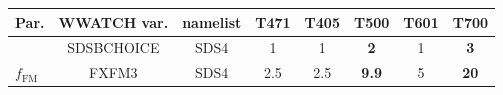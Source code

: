 \begin{landscape}
\begin{table}
\begin{center}
\begin{tabular}{|l|c|c|c|c|c|c|c|} \hline \hline
Par.                               &  WWATCH var.  & namelist  & T471        & T405             & T500         & T601        & T700  \\
\hline
 				   & SDSBCHOICE    & SDS4      &  1          &     1            & \textbf{2}   & 1           & \textbf{3}  \\  
  $f_{\mathrm{FM}}$                &  FXFM3        & SDS4      & 2.5         & 2.5              &\textbf{9.9}  & 5           & \textbf{20} \\

\end{tabular}
\end{center}
\end{table}
\end{landscape}
